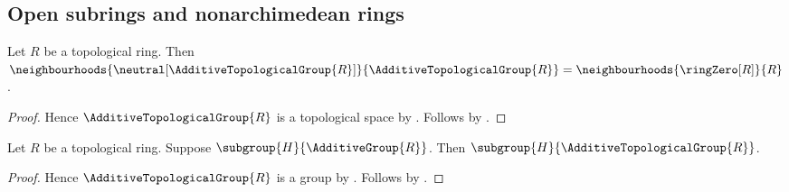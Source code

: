\subsection{Open subrings and nonarchimedean rings}

\begin{proposition}\label{additive_topological_group_neighbourhoods}
    Let $R$ be a topological ring.
    Then
        $\neighbourhoods{\neutral[\AdditiveTopologicalGroup{R}]}{
            \AdditiveTopologicalGroup{R}}
        =\neighbourhoods{\ringZero[R]}{R}$.
\end{proposition}
\begin{proof}
    Hence $\AdditiveTopologicalGroup{R}$ is a topological space by
        .
    Follows by
        .
\end{proof}

\begin{lemma}\label{additive_subgroup_of_additive_topological_group}
    Let $R$ be a topological ring.
    Suppose $\subgroup{H}{\AdditiveGroup{R}}$.
    Then $\subgroup{H}{\AdditiveTopologicalGroup{R}}$.
\end{lemma}
\begin{proof}
    Hence $\AdditiveTopologicalGroup{R}$ is a group by
        .
    Follows by
        .
\end{proof}

